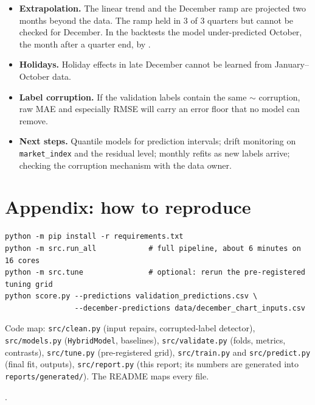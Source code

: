 \documentclass[10pt,letterpaper]{article}
\newcommand{\MI}{\texttt{market\_index}}
\begin{document}
\begin{itemize}
  \item \textbf{Extrapolation.} The linear trend and the December ramp are projected two
    months beyond the data. The ramp held in 3 of 3 quarters but cannot be checked for
    December. In the backtests the model under-predicted October, the month after a
    quarter end, by \HybOctBias.
  \item \textbf{Holidays.} Holiday effects in late December cannot be learned from
    January--October data.
  \item \textbf{Label corruption.} If the validation labels contain the same
    $\sim$\PctCorrupt{} corruption, raw MAE and especially RMSE will carry an error floor
    that no model can remove.
  \item \textbf{Next steps.} Quantile models for prediction intervals; drift monitoring on
    \MI{} and the residual level; monthly refits as new labels arrive; checking the
    corruption mechanism with the data owner.
\end{itemize}

\section*{Appendix: how to reproduce}

{\small
\begin{verbatim}
python -m pip install -r requirements.txt
python -m src.run_all            # full pipeline, about 6 minutes on 16 cores
python -m src.tune               # optional: rerun the pre-registered tuning grid
python score.py --predictions validation_predictions.csv \
                --december-predictions data/december_chart_inputs.csv
\end{verbatim}
}

{\small\raggedright
Code map: \texttt{src/clean.py} (input repairs, corrupted-label detector),
\texttt{src/models.py} (\texttt{HybridModel}, baselines), \texttt{src/validate.py} (folds,
metrics, contrasts), \texttt{src/tune.py} (pre-registered grid), \texttt{src/train.py} and
\texttt{src/predict.py} (final fit, outputs), \texttt{src/report.py} (this report; its numbers
are generated into \texttt{reports/generated/}). The README maps every file.

{\color{ink2}\Versions.}
}
\end{document}

